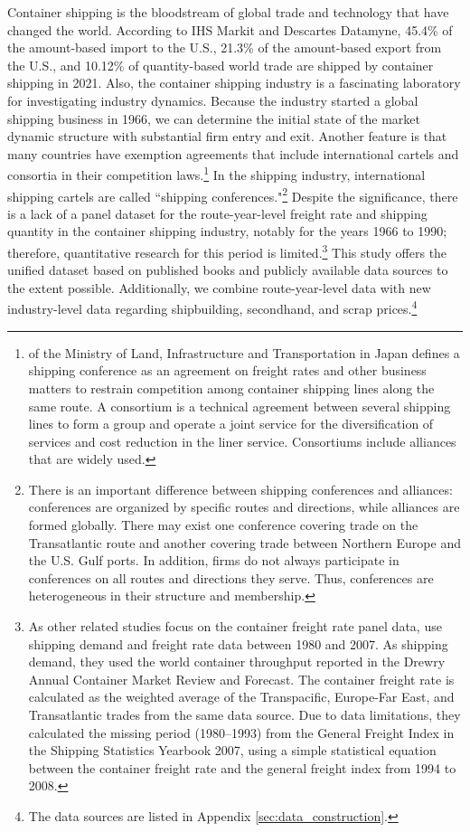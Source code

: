 \documentclass[11pt]{article}
\begin{document}
Container shipping is the bloodstream of global trade and technology that have changed the world. According to IHS Markit and Descartes Datamyne, 45.4\% of the amount-based import to the U.S., 21.3\% of the amount-based export from the U.S., and 10.12\% of quantity-based world trade are shipped by container shipping in 2021. Also, the container shipping industry is a fascinating laboratory for investigating industry dynamics. Because the industry started a global shipping business in 1966, we can determine the initial state of the market dynamic structure with substantial firm entry and exit. Another feature is that many countries have exemption agreements that include international cartels and consortia in their competition laws.\footnote{\cite{Anteitekina_kokusaikaijouyusoukakuhonotameno_kaijiseisakuno_arikatanitsuite2007} of the Ministry of Land, Infrastructure and Transportation in Japan defines a shipping conference as an agreement on freight rates and other business matters to restrain competition among container shipping lines along the same route. A consortium is a technical agreement between several shipping lines to form a group and operate a joint service for the diversification of services and cost reduction in the liner service. Consortiums include alliances that are widely used. } In the shipping industry, international shipping cartels are called  ``shipping conferences."\footnote{There is an important difference between shipping conferences and alliances: conferences are organized by specific routes and directions, while alliances are formed globally. There may exist one conference covering trade on the Transatlantic route and another covering trade between Northern Europe and the U.S. Gulf ports. In addition, firms do not always participate in conferences on all routes and directions they serve. Thus, conferences are heterogeneous in their structure and membership.} Despite the significance, there is a lack of a panel dataset for the route-year-level freight rate and shipping quantity in the container shipping industry, notably for the years 1966 to 1990; therefore, quantitative research for this period is limited.\footnote{As other related studies focus on the container freight rate panel data, \cite{luo2009econometric} use shipping demand and freight rate data between 1980 and 2007. As shipping demand, they used the world container throughput reported in the Drewry Annual Container Market Review and Forecast. The container freight rate is calculated as the weighted average of the Transpacific, Europe-Far East, and Transatlantic trades from the same data source. Due to data limitations, they calculated the missing period (1980–1993) from the General Freight Index in the Shipping Statistics Yearbook 2007, using a simple statistical equation between the container freight rate and the general freight index from 1994 to 2008.} This study offers the unified dataset based on published books and publicly available data sources to the extent possible. Additionally, we combine route-year-level data with new industry-level data regarding shipbuilding, secondhand, and scrap prices.\footnote{The data sources are listed in Appendix \ref{sec:data_construction}.} 
\end{document}
